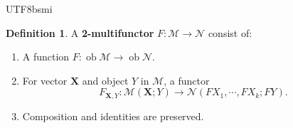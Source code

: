 \documentclass[12pt]{article}
\theoremstyle{definition}
\newtheorem{definition}{Definition}[section]
\newcommand\<{\langle}
\renewcommand\>{\rangle}
\DeclareMathOperator{\ob}{ob}
\begin{document}
\begin{CJK}{UTF8}{bsmi}
\begin{definition}
    A \textbf{2-multifunctor} $F:\mathcal{M}\to\mathcal{N}$ consist of:
    \begin{enumerate}
        \item A function $F:\ob\mathcal{M}\to\ob\mathcal{N}$.
        \item For vector $\textbf{X}$ and object $Y$ in $\mathcal{M}$, a functor
        \[
            F_{\textbf{X}, Y}:\mathcal{M}(\textbf{X}; Y)\to\mathcal{N}(FX_1, \cdots, FX_k; FY).
        \]
        \item Composition and identities are preserved.
    \end{enumerate}
\end{definition}






\end{CJK}
\end{document}
